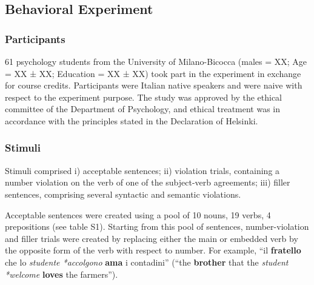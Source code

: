 
\subsection{Behavioral Experiment}
\subsubsection{Participants}
61 psychology students from the University of Milano-Bicocca (males = XX; Age = XX ± XX; Education = XX ± XX) took part in the experiment in exchange for course credits. 
Participants were Italian native speakers and were naive with respect to the experiment purpose. 
The study was approved by the ethical committee of the Department of Psychology, and ethical treatment was in accordance with the principles stated in the Declaration of Helsinki.

\subsubsection{Stimuli}
Stimuli comprised i) acceptable sentences; ii) violation trials, containing a number violation on the verb of one of the subject-verb agreements; iii) filler sentences, comprising several syntactic and semantic violations. 

Acceptable sentences were created using a pool of 10 nouns, 19 verbs, 4 prepositions (see table S1).
Starting from this pool of sentences, number-violation and filler trials were created by replacing either the main or embedded verb by the opposite form of the verb with respect to number. For example, ``il \textbf{fratello} che lo \emph{studente *accolgono} \textbf{ama} i contadini'' (``the \textbf{brother} that the \emph{student *welcome} \textbf{loves} the farmers'').

